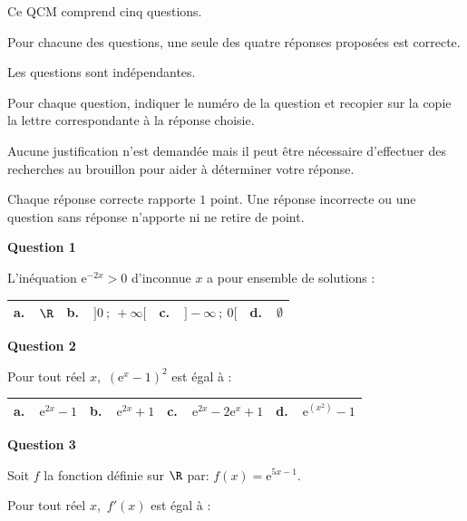 \medskip

Ce QCM comprend cinq questions.

Pour chacune des questions, une seule des quatre réponses proposées est correcte.

Les questions sont indépendantes.

Pour chaque question, indiquer le numéro de la question et recopier sur la copie la lettre correspondante à la réponse choisie.

Aucune justification n'est demandée mais il peut être nécessaire d'effectuer des recherches au brouillon pour aider à déterminer votre réponse.

Chaque réponse correcte rapporte $1$ point. Une réponse incorrecte ou une question sans réponse n'apporte ni ne retire de point.

\medskip

\textbf{Question 1}

\medskip

L'inéquation $\text{e}^{-2x} > 0$ d'inconnue $x$ a pour ensemble de solutions :

\begin{center}
\begin{tabularx}{\linewidth}{|*{4}{X|}}\hline
\textbf{a.~~}$\R$& \textbf{b.~~}$]0~;~ +\infty[$&\textbf{c.~~}$]- \infty~;~0[$&\textbf{d.~~}$\emptyset$ 
\\ \hline
\end{tabularx}
\end{center}

\medskip

\textbf{Question 2}

Pour tout réel $x$,\, $\left(\text{e}^{x} - 1\right)^2$ est égal à : 

\begin{center}
\begin{tabularx}{\linewidth}{|*{4}{X|}}\hline
\textbf{a.~~}$\text{e}^{2x} - 1$&\textbf{b.~~}$\text{e}^{2x} + 1$&\textbf{c.~~}$\text{e}^{2x} - 2\text{e}^{x}  + 1$&\textbf{d.~~}$\text{e}^{\left(x^2 \right)} - 1$\\ \hline
\end{tabularx}
\end{center}

\medskip

\textbf{Question 3}

Soit $f$ la fonction définie sur $\R$ par: $f(x) = \text{e}^{5x- 1}$.

Pour tout réel $x$, \,$f' (x)$ est égal à :

